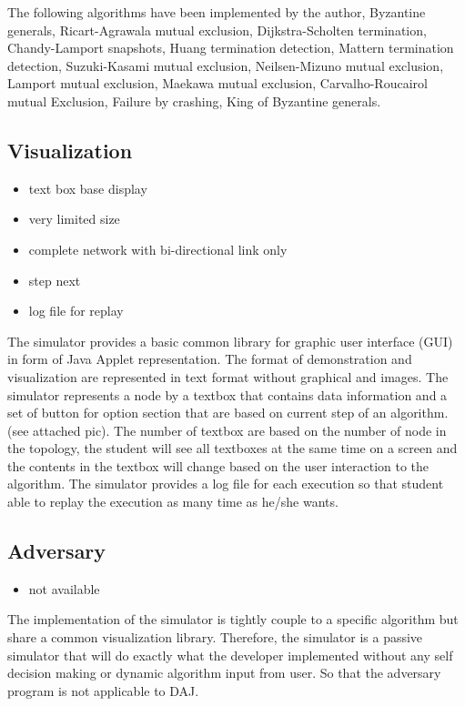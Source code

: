 The following algorithms have been implemented by the author,  Byzantine generals, Ricart-Agrawala mutual exclusion, Dijkstra-Scholten termination, Chandy-Lamport snapshots, Huang termination detection, Mattern termination detection, Suzuki-Kasami mutual exclusion, Neilsen-Mizuno mutual exclusion, Lamport mutual exclusion, Maekawa mutual exclusion, Carvalho-Roucairol mutual Exclusion, Failure by crashing, King of Byzantine generals.

\subsection*{Visualization}
\begin{itemize}
\item text box base display
\item very limited size
\item complete network with bi-directional link only
\item step next
\item log file for replay
\end{itemize}

The simulator provides a basic common library for graphic user interface (GUI) in form of Java Applet representation. The format of demonstration and visualization are represented in text format without graphical and images. The simulator represents a node by a textbox that contains data information and a set of button for option section that are based on current step of an algorithm. (see attached pic). The number of textbox are based on the number of node in the topology, the student will see all textboxes at the same time on a screen and the contents in the textbox will change based on the user interaction to the algorithm. The simulator provides a log file for each execution so that student able to replay the execution as many time as he/she wants.

\subsection*{Adversary}
\begin{itemize}
\item not available
\end{itemize}

The implementation of the simulator is tightly couple to a specific algorithm but share a common visualization library. Therefore, the simulator is a passive simulator that will do exactly what the developer implemented without any self decision making or dynamic algorithm input from user. So that the adversary program is not applicable to DAJ.


